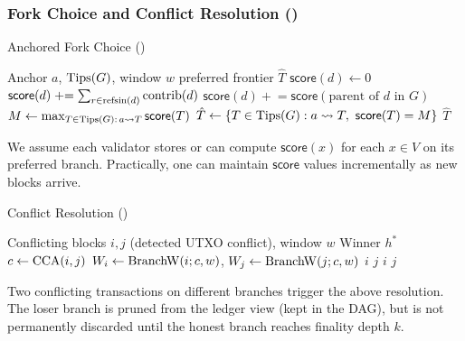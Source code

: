 \subsubsection{Fork Choice and Conflict Resolution (\ProjBase)}
\begin{algorithm}[H]
\caption{Anchored Fork Choice (\ProjBase)}
\label{alg:fork-choice}
\begin{algorithmic}[1]
\Require Anchor $a$, $\mathrm{Tips}(G)$, window $w$
\Ensure preferred frontier $\hat{T}$
  \State $\mathsf{score}(d) \gets 0$
\EndFor
{}
  \State $\mathsf{score}(d) \mathrel{+}= \sum_{r\in \mathrm{refs}{\mathrm{in}}(d)} \mathrm{contrib}(d)$ 
  \State $\mathsf{score}(d) \mathrel{+}= \mathsf{score}(\text{parent of }d\text{ in }G)$ 
\EndFor
\State $M \gets \max_{T\in \mathrm{Tips}(G):\,a\leadsto T} \mathsf{score}(T)$
\State $\hat{T} \gets \{ T\in \mathrm{Tips}(G) : a\leadsto T,\ \mathsf{score}(T) = M \}$
\State \Return $\hat{T}$
\end{algorithmic}
\end{algorithm}

\begin{remark}
We assume each validator stores or can compute $\mathsf{score}(x)$ for each $x\in V$ on its preferred branch. Practically, one can maintain $\mathsf{score}$ values incrementally as new blocks arrive.
\end{remark}

\begin{algorithm}[H]
\caption{Conflict Resolution (\ProjBase)}
\label{alg:cca-resolve}
\begin{algorithmic}[1]
\Require Conflicting blocks $i,j$ (detected UTXO conflict), window $w$
\Ensure Winner $h^*$
\State $c \gets \mathrm{CCA}(i,j)$
\State $W_i\gets\mathrm{BranchW}(i;c,w)$, \quad $W_j\gets\mathrm{BranchW}(j;c,w)$
 \Return $i$
 \Return $j$
\Else 
       \Return $i$
      \Else \Return $j$ 
      \EndIf
\EndIf
\end{algorithmic}
\end{algorithm}

\begin{remark}
Two conflicting transactions on different branches trigger the above resolution. The loser branch is pruned from the ledger view (kept in the DAG), but is not permanently discarded until the honest branch reaches finality depth $k$.
\end{remark}


